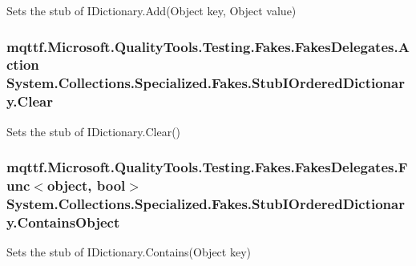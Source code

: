 Sets the stub of I\-Dictionary.\-Add(\-Object key, Object value)

\hypertarget{class_system_1_1_collections_1_1_specialized_1_1_fakes_1_1_stub_i_ordered_dictionary_ad4d1d8d664213e4c0757563bb7bc88a7}{
\subsubsection[{Clear}]{\setlength{\rightskip}{0pt plus 5cm}mqttf.\-Microsoft.\-Quality\-Tools.\-Testing.\-Fakes.\-Fakes\-Delegates.\-Action System.\-Collections.\-Specialized.\-Fakes.\-Stub\-I\-Ordered\-Dictionary.\-Clear}}\label{class_system_1_1_collections_1_1_specialized_1_1_fakes_1_1_stub_i_ordered_dictionary_ad4d1d8d664213e4c0757563bb7bc88a7}


Sets the stub of I\-Dictionary.\-Clear()

\hypertarget{class_system_1_1_collections_1_1_specialized_1_1_fakes_1_1_stub_i_ordered_dictionary_a7bceceef5b6ad0d5cad0b910822aa4d3}{
\subsubsection[{Contains\-Object}]{\setlength{\rightskip}{0pt plus 5cm}mqttf.\-Microsoft.\-Quality\-Tools.\-Testing.\-Fakes.\-Fakes\-Delegates.\-Func$<$object, bool$>$ System.\-Collections.\-Specialized.\-Fakes.\-Stub\-I\-Ordered\-Dictionary.\-Contains\-Object}}\label{class_system_1_1_collections_1_1_specialized_1_1_fakes_1_1_stub_i_ordered_dictionary_a7bceceef5b6ad0d5cad0b910822aa4d3}


Sets the stub of I\-Dictionary.\-Contains(\-Object key)

